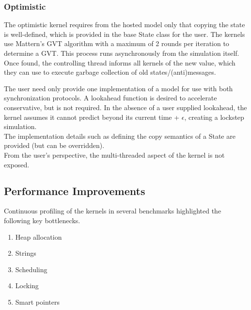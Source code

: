 \subsubsection{Optimistic}
The optimistic kernel requires from the hosted model only that copying the state is well-defined, which is provided in the base State class for the user.%
The kernels use Mattern's %
GVT algorithm with a maximum of 2 rounds per iteration to determine a GVT. This process runs asynchronously from the simulation itself. Once found, the controlling thread informs all kernels of the new value, which they can use to execute garbage collection of old states/(anti)messages. 

The user need only provide one implementation of a model for use with both synchronization protocols. A lookahead function is desired to accelerate conservative, but is not required. In the absence of a user supplied lookahead, the kernel assumes it cannot predict beyond its current time + $\epsilon$, creating a lockstep simulation. %
\\
The implementation details such as defining the copy semantics of a State are provided (but can be overridden). \\
From the user's perspective, the multi-threaded aspect of the kernel is not exposed. %

\subsection{Performance Improvements}
Continuous profiling of the kernels in several benchmarks highlighted the following key bottlenecks. 
\begin{enumerate}
	\item Heap allocation
	\item Strings 
	\item Scheduling
	\item Locking
	\item Smart pointers
\end{enumerate}
